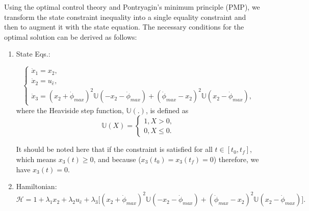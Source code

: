 \documentclass[journal ]{new-aiaa}
\begin{document}
	Using the optimal control theory and Pontryagin's minimum principle (PMP), we transform the state constraint inequality into a single equality constraint and then to augment it with the state equation\cite{kirk1970}. The necessary conditions for the optimal solution can be derived as follows:
	\begin{enumerate}
		\item State Eqs.:

		\begin{equation}
		\left\{
		\begin{array}{l}
		\dot{x}_1=x_2, \\
		\dot{x}_2=u_{\hat{e}}, \\
		\dot{x}_3=(x_2+\dot{\phi}_{max})^2\mathbb{U}(-x_2-\dot{\phi}_{max})+(\dot{\phi}_{max}-x_2)^2\mathbb{U}(x_2-\dot{\phi}_{max}),
		\end{array}
		\right.
		\end{equation}
		where the Heaviside step function, $\mathbb{U}(.)$, is defined as
		\begin{equation}
	\mathbb{U}(X)=\left\{
		\begin{array}{l}
		1,   X>0, \\
		0,   X\leq 0.
		\end{array}
		\right.
		\end{equation}

		It should be noted here that if the constraint is satisfied for all $t\in[t_0, t_f]$, which means $x_3(t)\geq 0$,  and because ($x_3(t_0)=x_3(t_f)=0$) therefore, we have $x_3(t)= 0$.
 
		
		\item Hamiltonian:
		\begin{equation}
		\mathscr{H}= 1+\lambda_1x_2+\lambda_2 u_{\hat{e}}+\lambda_3\Big[(x_2+\dot{\phi}_{max})^2\mathbb{U}(-x_2-\dot{\phi}_{max})
		 +(\dot{\phi}_{max}-x_2)^2\mathbb{U}(x_2-\dot{\phi}_{max})\Big].
		\end{equation}
		
		

\end{enumerate}
\end{document}
